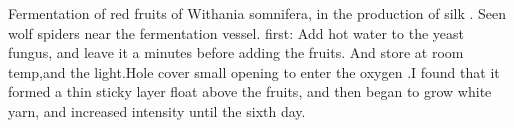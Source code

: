 
Fermentation of red fruits of Withania somnifera, in the production of silk .
Seen wolf spiders near the fermentation vessel.
first: Add hot water to the yeast fungus, and leave it a minutes before adding the fruits. And store at room temp,and the light.Hole cover small opening to enter the oxygen .I found that it formed a thin sticky layer float above the fruits, and then began to grow white yarn, and increased intensity until the sixth day.  